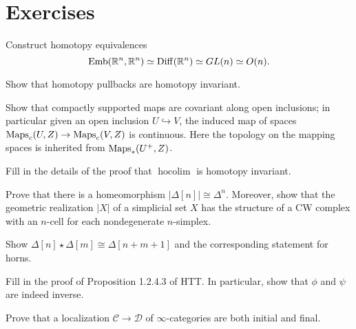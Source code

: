 \documentclass{amsart}
\DeclareMathOperator{\Emb}{Emb}
\DeclareMathOperator{\hocolim}{hocolim}
\begin{document}
\newpage


\appendix

\section{Exercises}

\begin{exercise}
    Construct homotopy equivalences
    \begin{equation*}
        \Emb(\R^n,\R^n) \simeq \Diff(\R^n) \simeq GL(n) \simeq O(n).
    \end{equation*}
\end{exercise}

\begin{exercise}
    Show that homotopy pullbacks are homotopy invariant.
\end{exercise}

\begin{exercise}
    Show that compactly supported maps are covariant along open inclusions; in particular given an
    open inclusion $U\hookrightarrow V$, the induced map of spaces
    $\operatorname{Maps}_c(U,Z)\to \operatorname{Maps}_c(V,Z)$ is continuous. Here the topology on the mapping spaces is
    inherited from $\operatorname{Maps}_*(U^+,Z)$.
\end{exercise}

\begin{exercise}
    Fill in the details of the proof that $\hocolim$ is homotopy invariant.
\end{exercise}

\begin{exercise}
    Prove that there is a homeomorphism $|\Delta[n]|\cong \Delta^n$. Moreover, show that
    the geometric realization $|X|$ of a simplicial set $X$ has the structure of a CW
    complex with an $n$-cell for each nondegenerate $n$-simplex.
\end{exercise}

\begin{exercise}
    Show $\Delta[n]\star \Delta[m]\cong \Delta[n+m+1]$ and the corresponding statement
    for horns.
\end{exercise}

\begin{exercise}
    Fill in the proof of Proposition 1.2.4.3 of HTT. In particular, show that $\phi$ and
    $\psi$ are indeed inverse.
\end{exercise}

\begin{exercise}
    Prove that a localization $\mathcal{C}\to \mathcal{D}$ of $\infty$-categories are
    both initial and final.
\end{exercise}
\end{document}
